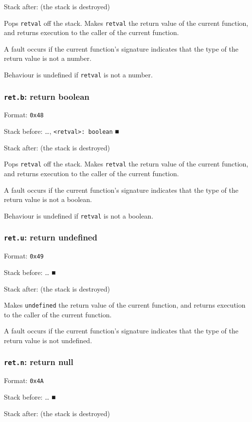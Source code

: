 \documentclass[11pt]{article}
\begin{document}
Stack after: (the stack is destroyed)

Pops \texttt{retval} off the stack. Makes \texttt{retval} the return value of the
current function, and returns execution to the caller of the current
function.

A fault occurs if the current function's signature indicates that the
type of the return value is not a number.

Behaviour is undefined if \texttt{retval} is not a number.

\subsubsection{\texttt{ret.b}: return boolean}
\label{sec:org489d37c}
Format: \texttt{0x48}

Stack before: \ldots{}​, \texttt{<retval>: boolean} ■

Stack after: (the stack is destroyed)

Pops \texttt{retval} off the stack. Makes \texttt{retval} the return value of the
current function, and returns execution to the caller of the current
function.

A fault occurs if the current function's signature indicates that the
type of the return value is not a boolean.

Behaviour is undefined if \texttt{retval} is not a boolean.

\subsubsection{\texttt{ret.u}: return undefined}
\label{sec:org4462eb4}
Format: \texttt{0x49}

Stack before: \ldots{}​ ■

Stack after: (the stack is destroyed)

Makes \texttt{undefined} the return value of the current function, and returns
execution to the caller of the current function.

A fault occurs if the current function's signature indicates that the
type of the return value is not undefined.

\subsubsection{\texttt{ret.n}: return null}
\label{sec:org02d0940}
Format: \texttt{0x4A}

Stack before: \ldots{}​ ■

Stack after: (the stack is destroyed)
\end{document}
